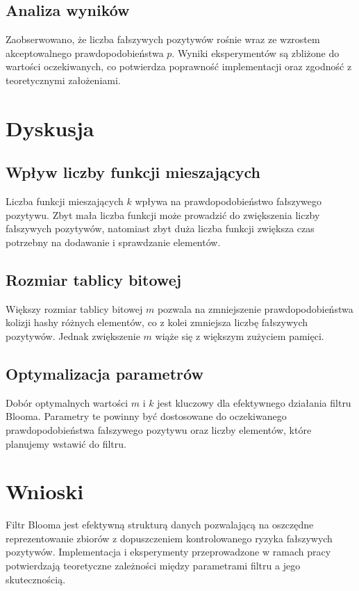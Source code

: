 \documentclass{article}
\begin{document}
\subsection{Analiza wyników}

Zaobserwowano, że liczba fałszywych pozytywów rośnie wraz ze wzrostem akceptowalnego prawdopodobieństwa $p$. Wyniki eksperymentów są zbliżone do wartości oczekiwanych, co potwierdza poprawność implementacji oraz zgodność z teoretycznymi założeniami.

\newpage

\section{Dyskusja}

\subsection{Wpływ liczby funkcji mieszających}

Liczba funkcji mieszających $k$ wpływa na prawdopodobieństwo fałszywego pozytywu. Zbyt mała liczba funkcji może prowadzić do zwiększenia liczby fałszywych pozytywów, natomiast zbyt duża liczba funkcji zwiększa czas potrzebny na dodawanie i sprawdzanie elementów.

\subsection{Rozmiar tablicy bitowej}

Większy rozmiar tablicy bitowej $m$ pozwala na zmniejszenie prawdopodobieństwa kolizji hashy różnych elementów, co z kolei zmniejsza liczbę fałszywych pozytywów. Jednak zwiększenie $m$ wiąże się z większym zużyciem pamięci.

\subsection{Optymalizacja parametrów}

Dobór optymalnych wartości $m$ i $k$ jest kluczowy dla efektywnego działania filtru Blooma. Parametry te powinny być dostosowane do oczekiwanego prawdopodobieństwa fałszywego pozytywu oraz liczby elementów, które planujemy wstawić do filtru.

\section{Wnioski}

Filtr Blooma jest efektywną strukturą danych pozwalającą na oszczędne reprezentowanie zbiorów z dopuszczeniem kontrolowanego ryzyka fałszywych pozytywów. Implementacja i eksperymenty przeprowadzone w ramach pracy potwierdzają teoretyczne zależności między parametrami filtru a jego skutecznością.
\end{document}
